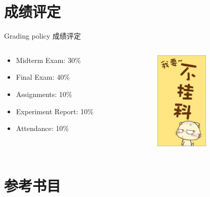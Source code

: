 \documentclass[10pt]{beamer}
\begin{document}
\section{成绩评定}
\begin{frame}{Grading policy}
成绩评定
    \begin{columns}
        \begin{column}{0.6\textwidth}
        
        \begin{itemize}
    \item Midterm Exam: \alert{
30\%}
    \item Final Exam: \alert{40\%}
    \item Assignments: \alert{10\%}
    \item Experiment Report: \alert{10\%}
    \item Attendance: \alert{10\%}
    \end{itemize}
        \end{column}
        \begin{column}{0.4\textwidth}
        \begin{figure}[htbp] 
        \centering\includegraphics[width=1.0in]{source/intro12.jpg} 
        \end{figure} 
        
        \end{column}
        \end{columns}
    
    
\end{frame}

\section{参考书目}
\end{document}
